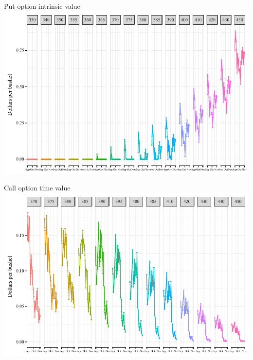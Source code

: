 \documentclass[table,xcolor=pdftex,dvipsnames]{beamer}\usepackage[]{graphicx}\usepackage[]{color}
\makeatletter
\def\maxwidth{ %
  \ifdim\Gin@nat@width>\linewidth
    \linewidth
  \else
    \Gin@nat@width
  \fi
}
\newenvironment{knitrout}{}{} %
\makeatother
\begin{document}

\begin{frame}{Put option intrinsic value}
\begin{knitrout}
\color{fgcolor}
\includegraphics[width=\maxwidth]{figure/put_intrinsic-1} 

\end{knitrout}
\end{frame}


\begin{frame}{Call option time value}
\begin{knitrout}
\color{fgcolor}
\includegraphics[width=\maxwidth]{figure/call_time-1} 

\end{knitrout}
\end{frame}
\end{document}
